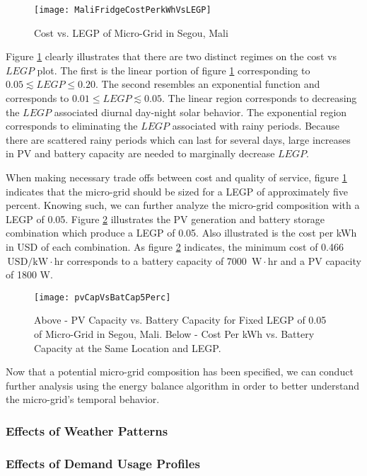 \documentclass{article}
\newcommand{\unit}[1]{\ensuremath{\, \mathrm{#1}}}
\begin{document}
\begin{figure}[ht]  
  \centering
    \texttt{[image: MaliFridgeCostPerkWhVsLEGP]}
  \caption{Cost vs. LEGP of Micro-Grid in Segou, Mali}
  \label{CostVLEGPMali}
\end{figure}

Figure \ref{CostVLEGPMali} clearly illustrates that there are two distinct regimes on the cost vs $LEGP$ plot. 
The first is the linear portion of figure \ref{CostVLEGPMali} corresponding to $ 0.05 \lesssim LEGP \leq 0.20$. 
The second resembles an exponential function and corresponds to $ 0.01 \leq LEGP \lesssim 0.05$. 
The linear region corresponds to decreasing the $LEGP$ associated diurnal day-night solar behavior. 
The exponential region corresponds to eliminating the $LEGP$ associated with rainy periods.
Because there are scattered rainy periods which can last for several days, large increases in PV and battery capacity are needed to marginally decrease $LEGP$.

When making necessary trade offs between cost and quality of service, figure \ref{CostVLEGPMali} indicates that the micro-grid should be sized for a LEGP of approximately five percent.
Knowing such, we can further analyze the micro-grid composition with a LEGP of 0.05.
Figure \ref{pvBat5} illustrates the PV generation and battery storage combination which produce a LEGP of 0.05. 
Also illustrated is the cost per kWh in USD of each combination. 
As figure \ref{pvBat5} indicates, the minimum cost of 0.466 \unit{USD/kW\cdot hr} corresponds to a battery capacity of 7000 \unit{W\cdot hr} and a PV capacity of 1800 W.

\begin{figure}[ht] 
  \centering
    \texttt{[image: pvCapVsBatCap5Perc]}
  \caption{Above - PV Capacity vs. Battery Capacity for Fixed LEGP of 0.05 of Micro-Grid in Segou, Mali. Below - Cost Per kWh vs. Battery Capacity at the Same Location and LEGP.}
\label{pvBat5}
\end{figure}

Now that a potential micro-grid composition has been specified, we can conduct further analysis using the energy balance algorithm in order to better understand the micro-grid's temporal behavior.


\subsubsection{Effects of Weather Patterns}

\subsubsection{Effects of Demand Usage Profiles}
\end{document}
